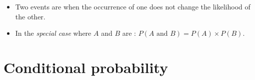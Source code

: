 \begin{itemize}
\item Two events are  when the occurrence of one does not change the likelihood of the other.

\item In the \emph{special case} where $A$ and $B$ are :
$P(A \text{ and } B) = P(A)\times P(B)$.

\end{itemize}

{}



\section[Conditional probability]{Conditional probability }
\label{conditionalProbabilitySection}

